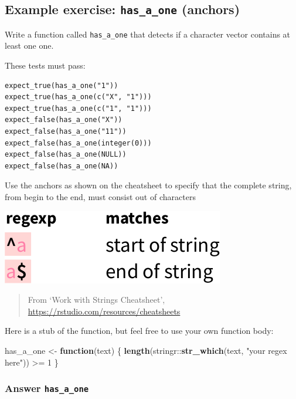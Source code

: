 \documentclass[]{book}
\newenvironment{Shaded}{}{}
\newcommand{\ControlFlowTok}[1]{\textcolor[rgb]{0.00,0.44,0.13}{\textbf{#1}}}
\newcommand{\DecValTok}[1]{\textcolor[rgb]{0.25,0.63,0.44}{#1}}
\newcommand{\KeywordTok}[1]{\textcolor[rgb]{0.00,0.44,0.13}{\textbf{#1}}}
\newcommand{\NormalTok}[1]{#1}
\newcommand{\OperatorTok}[1]{\textcolor[rgb]{0.40,0.40,0.40}{#1}}
\newcommand{\StringTok}[1]{\textcolor[rgb]{0.25,0.44,0.63}{#1}}
\begin{document}
\hypertarget{example-exercise-has_a_one-anchors}{%
\subsection{\texorpdfstring{Example exercise: \texttt{has\_a\_one} (anchors)}{Example exercise: has\_a\_one (anchors)}}\label{example-exercise-has_a_one-anchors}}

Write a function called \texttt{has\_a\_one} that detects if a character
vector contains at least one one.

These tests must pass:

\begin{verbatim}
expect_true(has_a_one("1"))
expect_true(has_a_one(c("X", "1")))
expect_true(has_a_one(c("1", "1")))
expect_false(has_a_one("X"))
expect_false(has_a_one("11"))
expect_false(has_a_one(integer(0)))
expect_false(has_a_one(NULL))
expect_false(has_a_one(NA))
\end{verbatim}

Use the anchors as shown on the cheatsheet to specify that
the complete string, from begin to the end, must consist out of characters

\includegraphics{data/06_anchors.png}

\begin{quote}
From `Work with Strings Cheatsheet', \url{https://rstudio.com/resources/cheatsheets}
\end{quote}

Here is a stub of the function, but feel free to use your own function body:

\begin{Shaded}
\begin{Highlighting}[]
\NormalTok{has_a_one <-}\StringTok{ }\ControlFlowTok{function}\NormalTok{(text) \{}
  \KeywordTok{length}\NormalTok{(stringr}\OperatorTok{::}\KeywordTok{str_which}\NormalTok{(text, }\StringTok{"your regex here"}\NormalTok{)) }\OperatorTok{>=}\StringTok{ }\DecValTok{1}
\NormalTok{\}}
\end{Highlighting}
\end{Shaded}

\hypertarget{answer-has_a_one}{%
\subsubsection{\texorpdfstring{Answer \texttt{has\_a\_one}}{Answer has\_a\_one}}\label{answer-has_a_one}}
\end{document}
